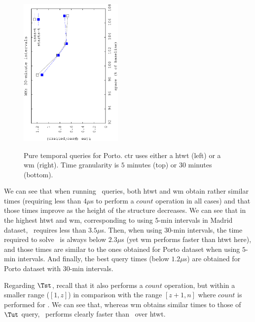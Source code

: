 \begin{figure}[!ht]
\begin{center}
				{\includegraphics[angle=-90,width=0.45\textwidth]{figures_synt/porto_t30mwm.eps}}
		\end{center}
		\vspace{-0.5cm}
		\caption{Pure temporal queries for Porto. \acrshort{ctr} uses either a \acrlong{htwt} (left) or a \acrlong{wm} (right). 
			Time granularity is $5$ minutes (top) or $30$ minutes (bottom).}
		\label{fig:portost_topk}
	\end{figure}



	We can see that when running \Tut\ queries, both \gls{htwt} and \gls{wm} obtain rather similar times (requiring less than 4$\mu$s 
	to perform a $count$ operation in all cases) and that those times improve as the height of the structure decreases. We can see 
	that in the highest \gls{htwt} and \gls{wm}, corresponding to using $5$-min intervals in Madrid dataset, \Tut\ requires less
	than $3.5\mu$s. Then, when using $30$-min intervals, the time required to solve \Tut\ is always below $2.3\mu$s (yet
	\gls{wm} performs faster than \gls{htwt} here), and those times are similar to the ones obtained for Porto dataset when
	using $5$-min intervals. And finally, the best query times (below $1.2\mu$s) are obtained for Porto dataset with 
	$30$-min intervals.

	Regarding $\Tst$, recall that it also performs a $count$ operation, but within a smaller range ($[1,z]$) in comparison with the range
	$[z+1,n]$ where  $count$ is performed for \Tut. We can see that, whereas \gls{wm} obtains similar times to those of 
	$\Tut$ query,  \Tst\ performs clearly faster than \Tut\ over \gls{htwt}.




